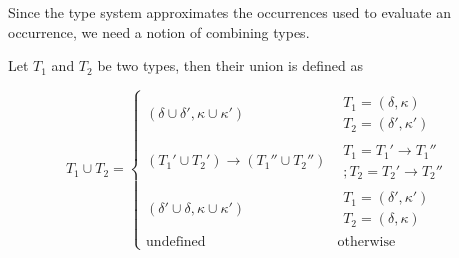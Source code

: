 \documentclass{eptcs}
\begin{document}
Since the type system approximates the occurrences used to evaluate an occurrence, we need a notion of combining types.

\begin{definition}
  	Let $T_1$ and $T_2$ be two types, then their union is defined as

  \[
T_1\cup T_2=
    \begin{cases}
      (\delta\cup\delta',\kappa\cup\kappa') & \begin{array}{l}
                                                T_1=(\delta,\kappa) \\
      T_2=(\delta',\kappa') \end{array} \\[3mm]
       (T_1'\cup T_2')\rightarrow (T_1''\cup T_2'') &
       \begin{array}{l} T_1=T_1'\rightarrow T_1'' \\;T_2=T_2'\rightarrow
       T_2''  \end{array}\\[3mm]
       (\delta' \cup \delta, \kappa \cup \kappa') & \begin{array}{l}
                                                      T_1 =
                                                      (\delta',\kappa') \\
                                                      T_2 =
                                                      (\delta,\kappa) \end{array}
                                                    \\[3mm]
       \text{undefined} & \text{otherwise}
    \end{cases}
\]
\end{definition}
\end{document}
